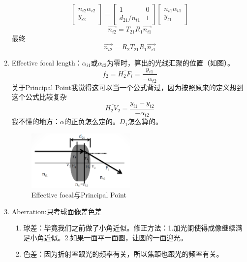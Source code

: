 \documentclass{ctexart}
\begin{document}
\begin{enumerate}
\begin{equation}
\left[\begin{array}{c}{n_{i 2} \alpha_{i 2}} \\ {y_{i 2}}\end{array}\right]=\left[\begin{array}{cc}{1} & {0} \\ {d_{21} / n_{t 1}} & {1}\end{array}\right]\left[\begin{array}{c}{n_{t 1} \alpha_{t 1}} \\ {y_{t 1}}\end{array}\right]
\end{equation}
\begin{equation}
\vec{n_{i2}}=T_{21}R_1 \vec{n_{i1}}
\end{equation}
最终
\begin{equation}
\vec{n_{t2}}=R_{2}T_{21}R_1 \vec{n_{i1}}
\end{equation}
\item Effective focal length：$\alpha_{i1}$或$\alpha_{t2}$为零时，算出的光线汇聚的位置（如图）。
\begin{equation}
f_{2}=\overline{H_{2} F_{i}}=\frac{y_{i 1}}{-\alpha_{t 2}}
\end{equation}
关于Principal Point我觉得这可以当一个公式背过，因为按照原来的定义想到这个公式比较复杂
\begin{equation}
\overline{H_{2} V_{2}}=\frac{y_{i 1}-y_{t 2}}{-\alpha_{t 2}}
\end{equation}
我不懂的地方：$\alpha$的正负怎么定的。$D_1$怎么算的。
\begin{figure}
\center
\includegraphics[width=0.5\textwidth]{EffectiveFocal.png}
\caption{Effective focal与Principal Point}
\end{figure}
\item Aberration:只考球面像差色差
\begin{enumerate}
\item 球差：毕竟我们之前做了小角近似。修正方法：1.加光阑使得成像继续满足小角近似。2.如果一面平一面圆，让圆的一面迎光。
\item 色差：因为折射率跟光的频率有关，所以焦距也跟光的频率有关。
\end{enumerate}
\end{enumerate}
\end{document}
